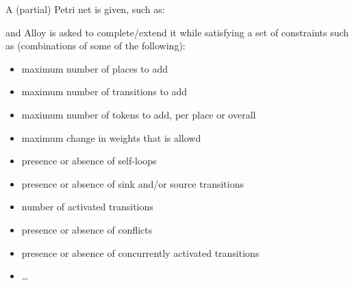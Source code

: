\documentclass{article}
\begin{document}
A (partial) Petri net is given, such as:
\begin{center}
\end{center}
and Alloy is asked to complete/extend it while satisfying a set of constraints such as (combinations of some of the following):
\begin{itemize}
\item
  maximum number of places to add
\item
  maximum number of transitions to add
\item
  maximum number of tokens to add, per place or overall
\item
  maximum change in weights that is allowd
\item
  presence or absence of self-loops
\item
  presence or absence of sink and/or source transitions
\item
  number of activated transitions
\item
  presence or absence of conflicts
\item
  presence or absence of concurrently activated transitions
\item
  \dots
\end{itemize}
\end{document}
